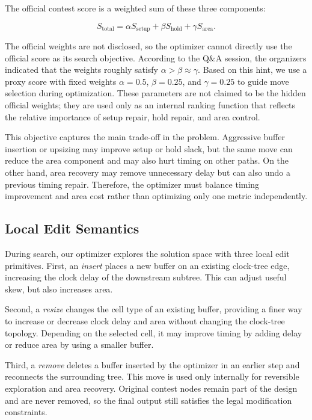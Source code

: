 \documentclass{article}
\begin{document}
The official contest score is a weighted sum of these three components:

\begin{equation}
  S_\mathrm{total} =
  \alpha S_{\mathrm{setup}} +
  \beta S_{\mathrm{hold}} +
  \gamma S_{\mathrm{area}}.
\end{equation}

The official weights are not disclosed, so the optimizer cannot directly use the official score as its search objective.  According to the Q\&A session, the organizers indicated that the weights roughly satisfy $\alpha > \beta \approx \gamma$.  Based on this hint, we use a proxy score with fixed weights $\alpha = 0.5$, $\beta = 0.25$, and $\gamma = 0.25$ to guide move selection during optimization.  These parameters are not claimed to be the hidden official weights; they are used only as an internal ranking function that reflects the relative importance of setup repair, hold repair, and area control.

This objective captures the main trade-off in the problem.  Aggressive buffer insertion or upsizing may improve setup or hold slack, but the same move can reduce the area component and may also hurt timing on other paths.  On the other hand, area recovery may remove unnecessary delay but can also undo a previous timing repair.  Therefore, the optimizer must balance timing improvement and area cost rather than optimizing only one metric independently.

\subsection{Local Edit Semantics}

During search, our optimizer explores the solution space with three local edit primitives. First, an \emph{insert} places a new buffer on an existing clock-tree edge, increasing the clock delay of the downstream subtree. This can adjust useful skew, but also increases area.

Second, a \emph{resize} changes the cell type of an existing buffer, providing a finer way to increase or decrease clock delay and area without changing the clock-tree topology. Depending on the selected cell, it may improve timing by adding delay or reduce area by using a smaller buffer.

Third, a \emph{remove} deletes a buffer inserted by the optimizer in an earlier step and reconnects the surrounding tree. This move is used only internally for reversible exploration and area recovery. Original contest nodes remain part of the design and are never removed, so the final output still satisfies the legal modification constraints.
\end{document}
